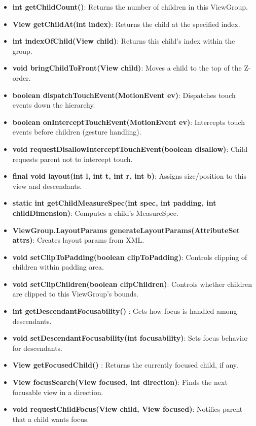 \documentclass{report}
\begin{document}
\begin{itemize}
\begin{itemize}
                \item \textbf{int getChildCount()}: Returns the number of children in this ViewGroup.
                \item \textbf{View getChildAt(int index)}: Returns the child at the specified index.
                \item \textbf{int indexOfChild(View child)}: Returns this child's index within the group.
                \item \textbf{void bringChildToFront(View child)}: Moves a child to the top of the Z-order.

                \item \textbf{boolean dispatchTouchEvent(MotionEvent ev)}: Dispatches touch events down the hierarchy.
                \item \textbf{boolean onInterceptTouchEvent(MotionEvent ev)}: Intercepts touch events before children (gesture handling).
                \item \textbf{void requestDisallowInterceptTouchEvent(boolean disallow)}: Child requests parent not to intercept touch.

                \item \textbf{final void layout(int l, int t, int r, int b)}: Assigns size/position to this view and descendants.
                \item \textbf{static int getChildMeasureSpec(int spec, int padding, int childDimension)}: Computes a child’s MeasureSpec.
                \item \textbf{ViewGroup.LayoutParams generateLayoutParams(AttributeSet attrs)}: Creates layout params from XML.

                \item \textbf{void setClipToPadding(boolean clipToPadding)}: Controls clipping of children within padding area.
                \item \textbf{void setClipChildren(boolean clipChildren)}: Controls whether children are clipped to this ViewGroup’s bounds.
                \item \textbf{int getDescendantFocusability()} : Gets how focus is handled among descendants.
                \item \textbf{void setDescendantFocusability(int focusability)}: Sets focus behavior for descendants.
                \item \textbf{View getFocusedChild()} : Returns the currently focused child, if any.
                \item \textbf{View focusSearch(View focused, int direction)}: Finds the next focusable view in a direction.
                \item \textbf{void requestChildFocus(View child, View focused)}: Notifies parent that a child wants focus.


\end{itemize}
\end{itemize}
\end{document}
